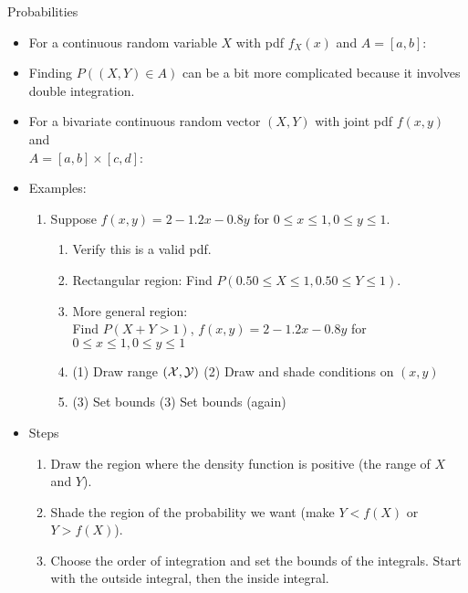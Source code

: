 \documentclass{article}
\begin{document}
Probabilities\bigskip
\begin{itemize}
    \item For a continuous random variable $X$ with pdf $f_X(x)$ and $A = [a, b]$:\vspace{100pt}
    \item Finding $P((X,Y) \in A)$ can be a bit more complicated because it involves double integration.
    \item[] For a bivariate continuous random vector $(X,Y)$ with joint pdf $f(x,y)$ and \\$A = [a, b] \times [c, d]$:\vspace{150pt}
    \item Examples:
    \begin{enumerate}    
        \item Suppose $f(x,y) = 2 - 1.2x - 0.8y$ \quad for $0 \le x \le 1, 0 \le y \le 1$.
        \begin{enumerate}
            \item Verify this is a valid pdf.\vspace{100pt}
            \item Rectangular region: Find $P(0.50 \le X \le 1, 0.50 \le Y \le 1)$.\vspace{190pt}
            \item More general region:\\ Find $P(X + Y > 1)$, \hspace{20pt} $f(x,y) = 2 - 1.2x - 0.8y$ \quad for $0 \le x \le 1, 0 \le y \le 1$\\
            \item[] (1) Draw range $(\cal{X},\cal{Y})$ \hfill (2) Draw and shade conditions on $(x,y)$\vspace{195pt}
            \item[] (3) Set bounds \hfill (3) Set bounds (again)\vspace{195pt}
        \end{enumerate}
    \end{enumerate}%
    \item[] Steps
    \begin{enumerate}[1)]
        \item Draw the region where the density function is positive (the range of $X$ and $Y$).
        \item Shade the region of the probability we want (make $Y < f(X)$ or $Y > f(X)$).
        \item Choose the order of integration and set the bounds of the integrals. Start with the outside integral, then the inside integral.

\end{enumerate}
\end{itemize}
\end{document}
